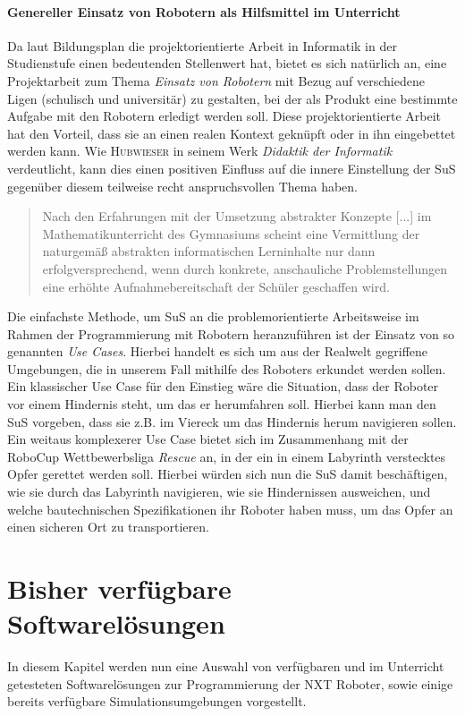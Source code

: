\documentclass[paper=a4, pagesize, DIV=calc, BCOR=15mm, twoside=on, onecolumn=on, open = right, titlepage =on, parskip =half-, headsepline = on, footsepline = on, chapterprefix = on, appendixprefix = off, fontsize = 12pt, numbers = noenddot, abstract = on]{scrbook}
\numberwithin{equation}{chapter}
\theoremstyle{definition}
\theoremstyle{plain}
\theoremstyle{plain}
\theoremstyle{remark}
\theoremstyle{plain}
\theoremstyle{plain}
\begin{document}
\subsubsection{Genereller Einsatz von Robotern als Hilfsmittel im Unterricht}
Da laut Bildungsplan die projektorientierte Arbeit in Informatik in der Studienstufe einen bedeutenden Stellenwert hat, bietet es sich natürlich an, eine Projektarbeit zum Thema \emph{Einsatz von Robotern} mit Bezug auf verschiedene Ligen (schulisch und universitär) zu gestalten, bei der als Produkt eine bestimmte Aufgabe mit den Robotern erledigt werden soll.  Diese projektorientierte Arbeit hat den Vorteil, dass sie an einen realen Kontext geknüpft oder in ihn eingebettet werden kann. Wie \textsc{Hubwieser} in seinem Werk \emph{Didaktik der Informatik} verdeutlicht, kann dies einen positiven Einfluss auf die innere Einstellung der SuS gegenüber diesem teilweise recht anspruchsvollen Thema haben.
\begin{quote}
Nach den Erfahrungen mit der Umsetzung abstrakter Konzepte [...] im Mathematikunterricht des Gymnasiums scheint eine Vermittlung der naturgemäß abstrakten informatischen Lerninhalte nur dann erfolgversprechend, wenn durch konkrete, anschauliche Problemstellungen eine erhöhte Aufnahmebereitschaft der Schüler geschaffen wird. \cite[S.68]{hubwieser:07}
\end{quote}

Die einfachste Methode, um SuS an die problemorientierte Arbeitsweise im Rahmen der Programmierung mit Robotern heranzuführen ist der Einsatz von so genannten \emph{Use Cases}. Hierbei handelt es sich um aus der Realwelt gegriffene Umgebungen, die in unserem Fall mithilfe des Roboters erkundet werden sollen. Ein klassischer Use Case für den Einstieg wäre die Situation, dass der Roboter vor einem Hindernis steht, um das er herumfahren soll. Hierbei kann man den SuS vorgeben, dass sie z.B. im Viereck um das Hindernis herum navigieren sollen.\\
Ein weitaus komplexerer Use Case bietet sich im Zusammenhang mit der RoboCup Wettbewerbsliga \emph{Rescue} an, in der ein in einem Labyrinth verstecktes Opfer gerettet werden soll. Hierbei würden sich nun die SuS damit beschäftigen, wie sie durch das Labyrinth navigieren, wie sie Hindernissen ausweichen, und welche bautechnischen Spezifikationen ihr Roboter haben muss, um das Opfer an einen sicheren Ort zu transportieren.

\chapter{Bisher verfügbare Softwarelösungen}
\label{sec:software bisher}
In diesem Kapitel werden nun eine Auswahl von verfügbaren und im Unterricht getesteten Softwarelösungen zur Programmierung der NXT Roboter, sowie einige bereits verfügbare Simulationsumgebungen vorgestellt. 
\end{document}

